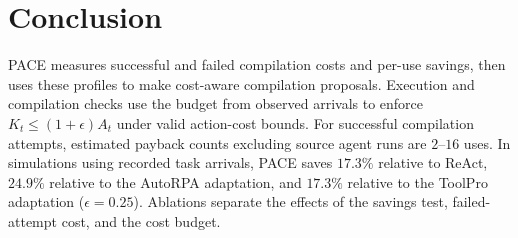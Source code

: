 \section{Conclusion}
\label{sec:conclusion}

PACE measures successful and failed compilation costs and per-use savings, then uses these profiles to make cost-aware compilation proposals.
Execution and compilation checks use the budget from observed arrivals to enforce $K_t\leq(1+\epsilon)A_t$ under valid action-cost bounds.
For successful compilation attempts, estimated payback counts excluding source agent runs are $2$--$16$ uses.
In simulations using recorded task arrivals, PACE saves $17.3\%$ relative to ReAct, $24.9\%$ relative to the AutoRPA adaptation, and $17.3\%$ relative to the ToolPro adaptation ($\epsilon=0.25$).
Ablations separate the effects of the savings test, failed-attempt cost, and the cost budget.
